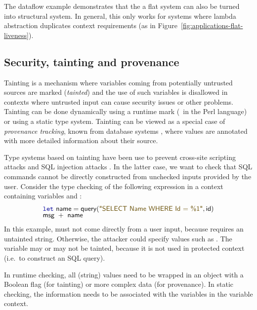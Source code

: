 The dataflow example demonstrates that the a flat system can also be turned into structural
system. In general, this only works for systems where lambda abstraction duplicates context
requirements (as in Figure~\ref{fig:applications-flat-liveness}).


\subsection{Security, tainting and provenance}
Tainting is a mechanism where variables coming from potentially untrusted sources are marked
(\emph{tainted}) and the use of such variables is disallowed in contexts where untrusted input
can cause security issues or other problems. Tainting can be done dynamically using a runtime mark
(\eg~in the Perl language) or using a static type system. Tainting can be viewed as a special
case of \emph{provenance tracking}, known from database systems \cite{app-provenance-db}, where
values are annotated with more detailed information about their source.

Type systems based on tainting have been use to prevent cross-site scripting attacks
\cite{app-tainting-xss} and SQL injection attacks \cite{app-tainting-sql,app-tainting-wasp}.
In the latter case, we want to check that SQL commands cannot be directly constructed from
unchecked inputs provided by the user. Consider the type checking of the following
expression in a context containing variables  and :
%
\begin{equation*}
\begin{array}{l}
\kvd{let}~\ident{name} = \ident{query}(\str{SELECT Name WHERE Id = \%1}, \ident{id})\\[-0.25em]
\ident{msg}~+~\ident{name}
\end{array}
\end{equation*}
%
In this example,  must not come directly from a user input, because  requires
an untainted string. Otherwise, the attacker could specify values such as .
The variable  may or may not be tainted, because it is not used in protected context
(i.e.~to construct an SQL query).

In runtime checking, all (string) values need to be wrapped in an object with a Boolean
flag (for tainting) or more complex data (for provenance). In static checking, the information
needs to be associated with the variables in the variable context.


